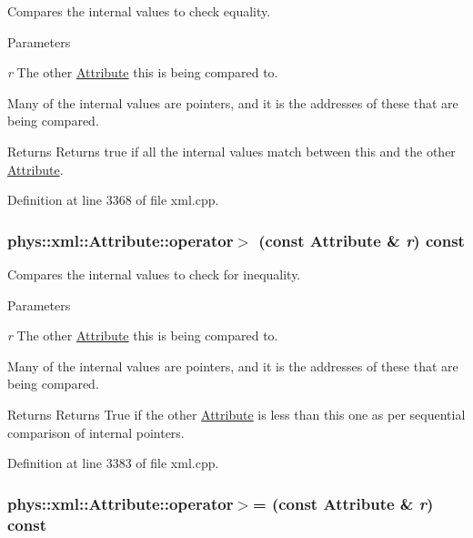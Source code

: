 Compares the internal values to check equality. 


\begin{DoxyParams}{Parameters}
\item[{\em r}]The other \hyperlink{classphys_1_1xml_1_1Attribute}{Attribute} this is being compared to.\end{DoxyParams}
Many of the internal values are pointers, and it is the addresses of these that are being compared. \begin{DoxyReturn}{Returns}
Returns true if all the internal values match between this and the other \hyperlink{classphys_1_1xml_1_1Attribute}{Attribute}. 
\end{DoxyReturn}


Definition at line 3368 of file xml.cpp.

\hypertarget{classphys_1_1xml_1_1Attribute_ac778ad4d7aa3a179217de1425e220848}{
\subsubsection[{operator$>$}]{\setlength{\rightskip}{0pt plus 5cm}phys::xml::Attribute::operator$>$ (const {\bf Attribute} \& {\em r}) const}}
\label{da/ddf/classphys_1_1xml_1_1Attribute_ac778ad4d7aa3a179217de1425e220848}


Compares the internal values to check for inequality. 


\begin{DoxyParams}{Parameters}
\item[{\em r}]The other \hyperlink{classphys_1_1xml_1_1Attribute}{Attribute} this is being compared to.\end{DoxyParams}
Many of the internal values are pointers, and it is the addresses of these that are being compared. \begin{DoxyReturn}{Returns}
Returns True if the other \hyperlink{classphys_1_1xml_1_1Attribute}{Attribute} is less than this one as per sequential comparison of internal pointers. 
\end{DoxyReturn}


Definition at line 3383 of file xml.cpp.

\hypertarget{classphys_1_1xml_1_1Attribute_ab1d63c57891107848492dc3316c95455}{
\subsubsection[{operator$>$=}]{\setlength{\rightskip}{0pt plus 5cm}phys::xml::Attribute::operator$>$= (const {\bf Attribute} \& {\em r}) const}}
\label{da/ddf/classphys_1_1xml_1_1Attribute_ab1d63c57891107848492dc3316c95455}


